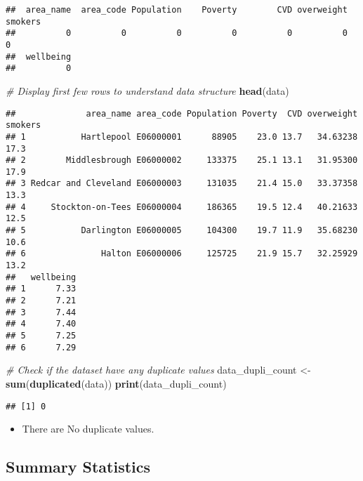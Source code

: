 \documentclass[
]{article}
\newenvironment{Shaded}{\begin{snugshade}}{\end{snugshade}}
\newcommand{\CommentTok}[1]{\textcolor[rgb]{0.56,0.35,0.01}{\textit{#1}}}
\newcommand{\FunctionTok}[1]{\textcolor[rgb]{0.13,0.29,0.53}{\textbf{#1}}}
\newcommand{\NormalTok}[1]{#1}
\newcommand{\OtherTok}[1]{\textcolor[rgb]{0.56,0.35,0.01}{#1}}
\providecommand{\tightlist}{%
  \setlength{\itemsep}{0pt}\setlength{\parskip}{0pt}}
\begin{document}
\begin{verbatim}
##  area_name  area_code Population    Poverty        CVD overweight    smokers 
##          0          0          0          0          0          0          0 
##  wellbeing 
##          0
\end{verbatim}

\begin{Shaded}
\begin{Highlighting}[]
\CommentTok{\# Display first few rows to understand data structure}
\FunctionTok{head}\NormalTok{(data)}
\end{Highlighting}
\end{Shaded}

\begin{verbatim}
##              area_name area_code Population Poverty  CVD overweight smokers
## 1           Hartlepool E06000001      88905    23.0 13.7   34.63238    17.3
## 2        Middlesbrough E06000002     133375    25.1 13.1   31.95300    17.9
## 3 Redcar and Cleveland E06000003     131035    21.4 15.0   33.37358    13.3
## 4     Stockton-on-Tees E06000004     186365    19.5 12.4   40.21633    12.5
## 5           Darlington E06000005     104300    19.7 11.9   35.68230    10.6
## 6               Halton E06000006     125725    21.9 15.7   32.25929    13.2
##   wellbeing
## 1      7.33
## 2      7.21
## 3      7.44
## 4      7.40
## 5      7.25
## 6      7.29
\end{verbatim}

\begin{Shaded}
\begin{Highlighting}[]
\CommentTok{\# Check if the dataset have any duplicate values}
\NormalTok{data\_dupli\_count }\OtherTok{\textless{}{-}} \FunctionTok{sum}\NormalTok{(}\FunctionTok{duplicated}\NormalTok{(data))}
\FunctionTok{print}\NormalTok{(data\_dupli\_count)}
\end{Highlighting}
\end{Shaded}

\begin{verbatim}
## [1] 0
\end{verbatim}

\begin{itemize}
\tightlist
\item
  There are No duplicate values.
\end{itemize}

\subsection{Summary Statistics}\label{summary-statistics}
\end{document}
